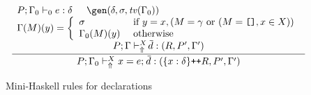\begin{figure}
\[\begin{array}{cc}
	\displaystyle\frac
	 {\begin{array}{ll}
           P;\Gamma_0 \vdash_0 e : \delta \: & \: \gen(\delta,\sigma,\tv(\Gamma_0))\\
           \multicolumn{2}{c}{\Gamma(M)(y) = \left\{ \begin{array}{ll}
                                    \sigma & \text{ if } y = x, (M = \gamma \text{ or }
                                                                 (M = \texttt{[]}, x \in X)) \\
                                      \Gamma_0(M)(y) & \text{ otherwise } 
                                   \end{array}\right. }\\[.2cm]                   
           \multicolumn{2}{c}{P;\Gamma \vdash_{\Uparrow}^X \overline{\!d} : (R,P',\Gamma')}
          \end{array}}
	 {P;\Gamma_0 \vdash_{\Uparrow}^X x = e;\: \overline{\!d} : (\{x:\delta\} \texttt{++} R,P',\Gamma')} 
\end{array} \]
\caption{Mini-Haskell rules for declarations}
\label{fig:mini-haskell-rules-for-declarations}
\end{figure}

